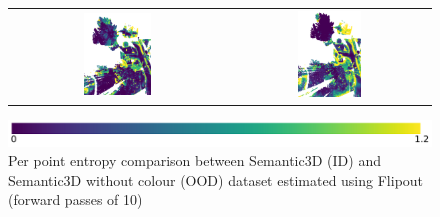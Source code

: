 \begin{figure}[h!]
\begin{tabular}{cc}
            \includegraphics[width=0.33\textwidth, height=0.18\textheight]{images/ood_imgs/fout_sem3d/fout_ent_3.pdf}&
            \includegraphics[width=0.33\textwidth, height=0.18\textheight]{images/sem3d_of/fout_ent_sem3d_of_3.pdf}\\
        \end{tabular}
        \includegraphics[scale=0.45]{images/ent_legend.pdf}
        \caption{Per point entropy comparison between Semantic3D (ID) and Semantic3D without colour (OOD) dataset estimated using Flipout (forward passes of 10)}
        \label{fig:fout_entmap_vis_sem3d_OF}
    \end{figure} 
    \FloatBarrier


